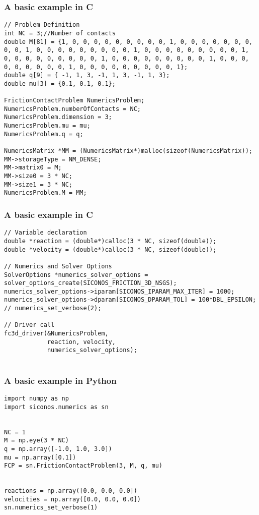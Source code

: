 \begin{frame}[fragile]
  \frametitle{A basic example in C}
    {\small
      \begin{verbatim}
// Problem Definition
int NC = 3;//Number of contacts
double M[81] = {1, 0, 0, 0, 0, 0, 0, 0, 0, 0, 1, 0, 0, 0, 0, 0, 0, 0, 0, 0, 1, 0, 0, 0, 0, 0, 0, 0, 0, 0, 1, 0, 0, 0, 0, 0, 0, 0, 0, 0, 1, 0, 0, 0, 0, 0, 0, 0, 0, 0, 1, 0, 0, 0, 0, 0, 0, 0, 0, 0, 1, 0, 0, 0, 0, 0, 0, 0, 0, 0, 1, 0, 0, 0, 0, 0, 0, 0, 0, 0, 1};
double q[9] = { -1, 1, 3, -1, 1, 3, -1, 1, 3};
double mu[3] = {0.1, 0.1, 0.1};

FrictionContactProblem NumericsProblem;
NumericsProblem.numberOfContacts = NC;
NumericsProblem.dimension = 3;
NumericsProblem.mu = mu;
NumericsProblem.q = q;

NumericsMatrix *MM = (NumericsMatrix*)malloc(sizeof(NumericsMatrix));
MM->storageType = NM_DENSE;
MM->matrix0 = M;
MM->size0 = 3 * NC;
MM->size1 = 3 * NC;
NumericsProblem.M = MM;
\end{verbatim}
}
\end{frame}
  
\begin{frame}[fragile]
  \frametitle{A basic example in C}
    {\small
      \begin{verbatim}
// Variable declaration
double *reaction = (double*)calloc(3 * NC, sizeof(double));
double *velocity = (double*)calloc(3 * NC, sizeof(double));

// Numerics and Solver Options
SolverOptions *numerics_solver_options = solver_options_create(SICONOS_FRICTION_3D_NSGS);
numerics_solver_options->iparam[SICONOS_IPARAM_MAX_ITER] = 1000;
numerics_solver_options->dparam[SICONOS_DPARAM_TOL] = 100*DBL_EPSILON;
// numerics_set_verbose(2);

// Driver call
fc3d_driver(&NumericsProblem,
            reaction, velocity,
            numerics_solver_options);
        
      \end{verbatim}
    }
  \end{frame}

\begin{frame}[fragile]
  \frametitle{A basic example in Python}
    {\small
      \begin{verbatim}
import numpy as np
import siconos.numerics as sn


NC = 1
M = np.eye(3 * NC)
q = np.array([-1.0, 1.0, 3.0])
mu = np.array([0.1])
FCP = sn.FrictionContactProblem(3, M, q, mu)


reactions = np.array([0.0, 0.0, 0.0])
velocities = np.array([0.0, 0.0, 0.0])
sn.numerics_set_verbose(1)

      \end{verbatim}
    }
  \end{frame}


